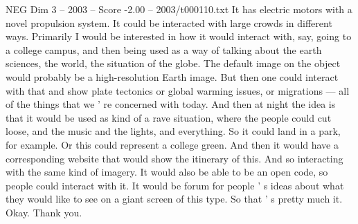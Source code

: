 \begin{textsample}{NEG Dim 3 – 2003 – Score -2.00 – 2003/t000110.txt}
It has electric motors with a novel propulsion system.
It could be interacted with large crowds in different ways.
Primarily I would be interested in how it would interact with, say, going to a college campus, and then being used as a way of talking about the earth sciences, the world, the situation of the globe.
The default image on the object would probably be a high-resolution Earth image.
But then one could interact with that and show plate tectonics or global warming issues, or migrations — all of the things that we ' re concerned with today.
And then at night the idea is that it would be used as kind of a rave situation, where the people could cut loose, and the music and the lights, and everything.
So it could land in a park, for example.
Or this could represent a college green.
And then it would have a corresponding website that would show the itinerary of this.
And so interacting with the same kind of imagery.
It would also be able to be an open code, so people could interact with it.
It would be forum for people ' s ideas about what they would like to see on a giant screen of this type.
So that ' s pretty much it.
Okay.
Thank you.

\end{textsample}
